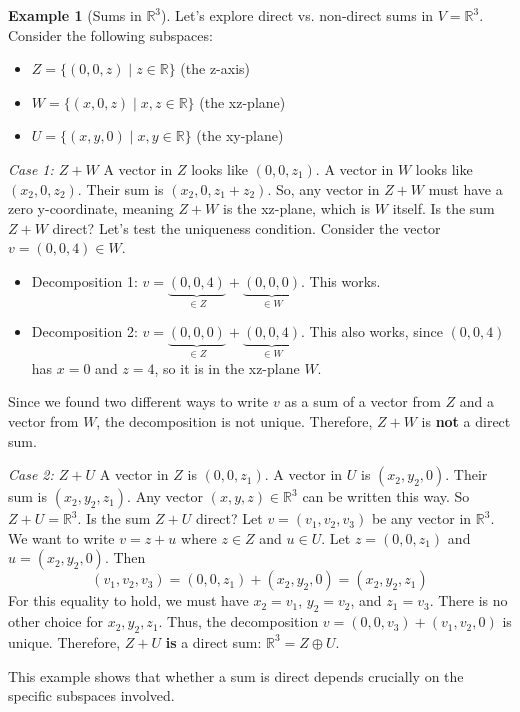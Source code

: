 \documentclass[11pt]{article}
\theoremstyle{definition}
\newtheorem{example}[theorem]{Example}
\theoremstyle{remark}
\newcommand{\R}{\mathbb{R}}
\newcommand{\directsum}{\oplus}
\begin{document}
\begin{example}[Sums in $\R^3$] \label{ex:R3_direct_sum}
Let's explore direct vs. non-direct sums in $V = \R^3$.
Consider the following subspaces:
\begin{itemize}
    \item $Z = \{ (0, 0, z) \mid z \in \R \}$ (the z-axis)
    \item $W = \{ (x, 0, z) \mid x, z \in \R \}$ (the xz-plane)
    \item $U = \{ (x, y, 0) \mid x, y \in \R \}$ (the xy-plane)
\end{itemize}

\textit{Case 1: $Z+W$}
A vector in $Z$ looks like $(0, 0, z_1)$. A vector in $W$ looks like $(x_2, 0, z_2)$. Their sum is $(x_2, 0, z_1+z_2)$. So, any vector in $Z+W$ must have a zero y-coordinate, meaning $Z+W$ is the xz-plane, which is $W$ itself.
Is the sum $Z+W$ direct? Let's test the uniqueness condition. Consider the vector $v = (0, 0, 4) \in W$.
\begin{itemize}
    \item Decomposition 1: $v = \underbrace{(0, 0, 4)}_{\in Z} + \underbrace{(0, 0, 0)}_{\in W}$. This works.
    \item Decomposition 2: $v = \underbrace{(0, 0, 0)}_{\in Z} + \underbrace{(0, 0, 4)}_{\in W}$. This also works, since $(0,0,4)$ has $x=0$ and $z=4$, so it is in the xz-plane $W$.
\end{itemize}
Since we found two different ways to write $v$ as a sum of a vector from $Z$ and a vector from $W$, the decomposition is not unique. Therefore, $Z+W$ is \textbf{not} a direct sum.

\textit{Case 2: $Z+U$}
A vector in $Z$ is $(0, 0, z_1)$. A vector in $U$ is $(x_2, y_2, 0)$. Their sum is $(x_2, y_2, z_1)$. Any vector $(x,y,z) \in \R^3$ can be written this way. So $Z+U = \R^3$.
Is the sum $Z+U$ direct? Let $v = (v_1, v_2, v_3)$ be any vector in $\R^3$. We want to write $v = z+u$ where $z \in Z$ and $u \in U$.
Let $z = (0, 0, z_1)$ and $u = (x_2, y_2, 0)$. Then
\[ (v_1, v_2, v_3) = (0, 0, z_1) + (x_2, y_2, 0) = (x_2, y_2, z_1) \]
For this equality to hold, we must have $x_2 = v_1$, $y_2 = v_2$, and $z_1 = v_3$. There is no other choice for $x_2, y_2, z_1$. Thus, the decomposition $v = (0, 0, v_3) + (v_1, v_2, 0)$ is unique.
Therefore, $Z+U$ \textbf{is} a direct sum: $\R^3 = Z \directsum U$.

This example shows that whether a sum is direct depends crucially on the specific subspaces involved.
\end{example}
\end{document}
